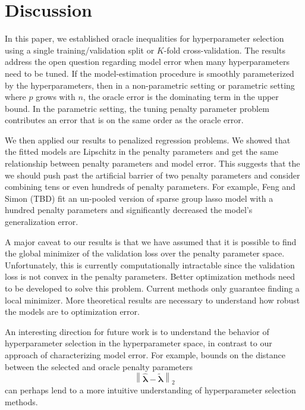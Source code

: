 \documentclass[12pt]{article}
\begin{document}
\section{Discussion}\label{sec:discussion}

In this paper, we established oracle inequalities for hyperparameter selection using a single training/validation split or $K$-fold cross-validation. The results address the open question regarding model error when many hyperparameters need to be tuned. If the model-estimation procedure is smoothly parameterized by the hyperparameters, then in a non-parametric setting or parametric setting where $p$ grows with $n$, the oracle error is the dominating term in the upper bound. In the parametric setting, the tuning penalty parameter problem contributes an error that is on the same order as the oracle error. 

We then applied our results to penalized regression problems. We showed that the fitted models are Lipschitz in the penalty parameters and get the same relationship between penalty parameters and model error. This suggests that the we should push past the artificial barrier of two penalty parameters and consider combining tens or even hundreds of penalty parameters. For example, Feng and Simon (TBD) fit an un-pooled version of sparse group lasso model with a hundred penalty parameters and significantly decreased the model's generalization error.

A major caveat to our results is that we have assumed that it is possible to find the global minimizer of the validation loss over the penalty parameter space. Unfortunately, this is currently computationally intractable since the validation loss is not convex in the penalty parameters. Better optimization methods need to be developed to solve this problem. Current methods only guarantee finding a local minimizer. More theoretical results are necessary to understand how robust the models are to optimization error.

An interesting direction for future work is to understand the behavior of hyperparameter selection in the hyperparameter space, in contrast to our approach of characterizing model error. For example, bounds on the distance between the selected and oracle penalty parameters
\begin{equation}
\label{penalty_diff}
\left \| \hat{\boldsymbol \lambda} - \tilde{\boldsymbol \lambda} \right \|_2
\end{equation}
can perhaps lend to a more intuitive understanding of hyperparameter selection methods.
\end{document}
